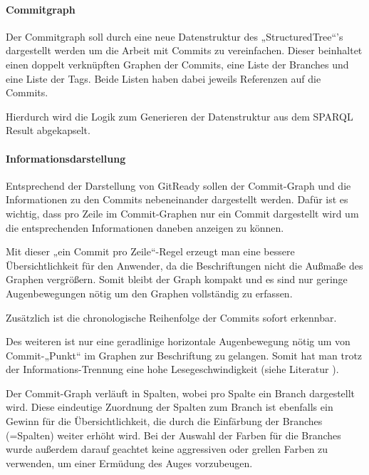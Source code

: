 \documentclass[color, ddc]{tudscrreprt}
\begin{document}
\paragraph{Commitgraph}
Der Commitgraph soll durch eine neue Datenstruktur des „StructuredTree“'s dargestellt werden um die Arbeit mit Commits zu vereinfachen. Dieser beinhaltet einen doppelt verknüpften Graphen der Commits, eine Liste der Branches und eine Liste der Tags. Beide Listen haben dabei jeweils Referenzen auf die Commits.

Hierdurch wird die Logik zum Generieren der Datenstruktur aus dem SPARQL Result abgekapselt.

\paragraph{Informationsdarstellung}

Entsprechend der Darstellung von GitReady sollen der Commit-Graph und die Informationen zu den Commits nebeneinander dargestellt werden. Dafür ist es wichtig, dass pro Zeile im Commit-Graphen nur ein Commit dargestellt wird um die entsprechenden Informationen daneben anzeigen zu können.

Mit dieser „ein Commit pro Zeile“-Regel erzeugt man eine bessere Übersichtlichkeit für den Anwender, da die Beschriftungen nicht die Außmaße des Graphen vergrößern. Somit bleibt der Graph kompakt und es sind nur geringe Augenbewegungen nötig um den Graphen vollständig zu erfassen.

Zusätzlich ist die chronologische Reihenfolge der Commits sofort erkennbar.

Des weiteren ist nur eine geradlinige horizontale Augenbewegung nötig um von Commit-„Punkt“ im Graphen zur Beschriftung zu gelangen. Somit hat man trotz der Informations-Trennung eine hohe Lesegeschwindigkeit (siehe Literatur \cite{goldberg:visualization-evaluation}).

Der Commit-Graph verläuft in Spalten, wobei pro Spalte ein Branch dargestellt wird. Diese eindeutige Zuordnung der Spalten zum Branch ist ebenfalls ein Gewinn für die Übersichtlichkeit, die durch die Einfärbung der Branches (=Spalten) weiter erhöht wird. Bei der Auswahl der Farben für die Branches wurde außerdem darauf geachtet keine aggressiven oder grellen Farben zu verwenden, um einer Ermüdung des Auges vorzubeugen.
\end{document}
